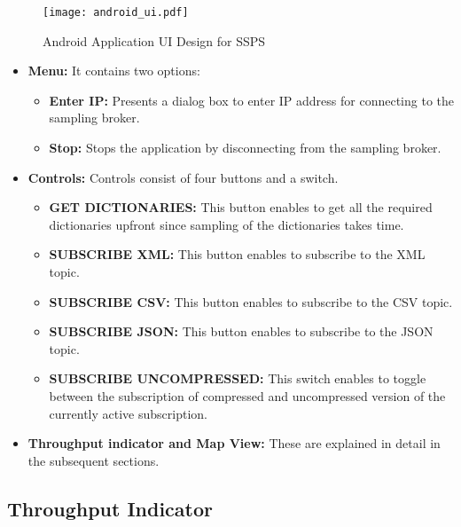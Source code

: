 \makeatletter
\setlength{\intextsep}{20pt}
\makeatother

\begin{figure}[h!]
\centering
\texttt{[image: android\_ui.pdf]}
\caption{Android Application UI Design for SSPS}\label{figures:android_ui}
\end{figure}

\begin{itemize}
    \item \textbf{Menu:}
          It contains two options: 
            \begin{itemize}
                \item \textbf{Enter IP:}
                Presents a dialog box to enter IP address for connecting to the sampling broker.
                \item \textbf{Stop:}
                Stops the application by disconnecting from the sampling broker.
            \end{itemize}

    \item \textbf{Controls:}
    Controls consist of four buttons and a switch.
    \begin{itemize}
        \item \textbf{GET DICTIONARIES:}
        This button enables to get all the required dictionaries upfront since sampling of the dictionaries takes time.
        \item \textbf{SUBSCRIBE XML:}
        This button enables to subscribe to the XML topic.
        \item \textbf{SUBSCRIBE CSV:}
        This button enables to subscribe to the CSV topic.
        \item \textbf{SUBSCRIBE JSON:}
        This button enables to subscribe to the JSON topic.
        \item \textbf{SUBSCRIBE UNCOMPRESSED:}
        This switch enables to toggle between the subscription of compressed and uncompressed version of the currently active subscription.
    \end{itemize}

    \item \textbf{Throughput indicator and Map View:}
    These are explained in detail in the subsequent sections.
\end{itemize}

\subsection{Throughput Indicator}


